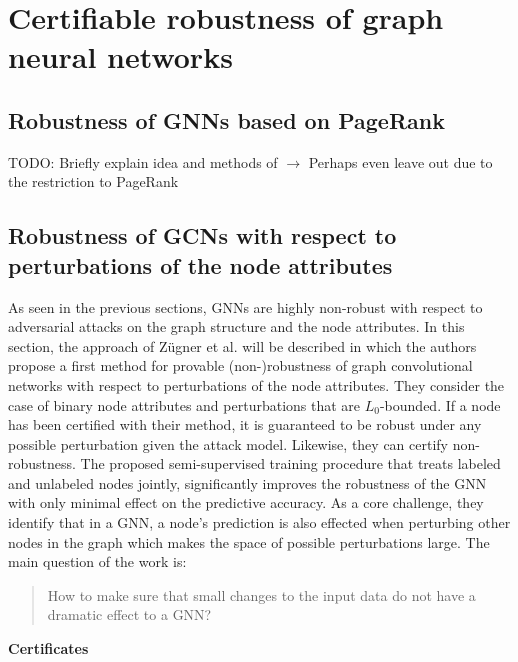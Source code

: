 \documentclass[a4paper,preprint]{sig-alternate}
\begin{document}
\section{Certifiable robustness of graph neural networks}
\label{sec:main_section}

\subsection{Robustness of GNNs based on PageRank}
\label{sec:paper_one}

TODO: Briefly explain idea and methods of \cite{bojchevski2019certifiable}\newline
$\rightarrow$ Perhaps even leave out due to the restriction to PageRank

\vfill
\pagebreak

\subsection{Robustness of GCNs with respect to perturbations of the node attributes}
\label{sec:paper_two}

As seen in the previous sections, GNNs are highly non-robust with respect to adversarial attacks on the graph
structure and the node attributes. In this section, the approach of Zügner et al. \cite{Z_gner_2019} will be described
in which the authors propose a first method for provable (non-)robustness of graph convolutional networks with respect
to perturbations of the node attributes.\newline
They consider the case of binary node attributes and perturbations that are $L_0$-bounded. If a node has been certified
with their method, it is guaranteed to be robust under any possible perturbation given the attack model. Likewise, they can
certify non-robustness. The proposed semi-supervised training procedure that treats labeled and unlabeled nodes jointly,
significantly improves the robustness of the GNN with only minimal effect on the predictive accuracy.
As a core challenge, they identify that in a GNN, a node's prediction is also effected when perturbing other nodes in the graph
which makes the space of possible perturbations large. The main question of the work is:
\begin{quote}
How to make sure that small changes to the input data do not have a dramatic effect to a GNN?
\end{quote}

\textbf{Certificates}\newline
\end{document}

